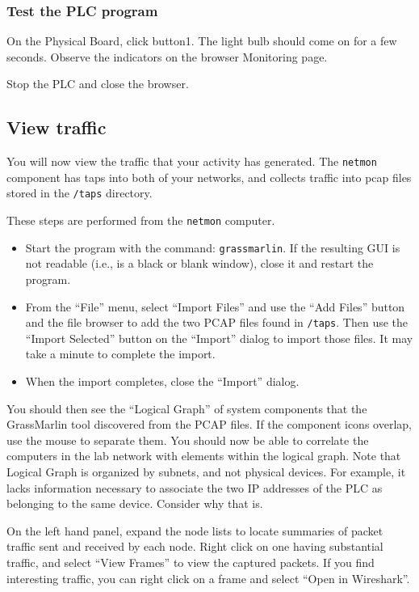 \subsubsection{Test the PLC program}
On the Physical Board, click button1.  The light bulb should come on for a few seconds.  Observe the indicators on the browser
Monitoring page.  

Stop the PLC and close the browser.

\subsection{View traffic}
You will now view the traffic that your activity has generated.  The {\tt netmon} component has taps into both of your networks, and collects 
traffic into pcap files stored in the {\tt /taps} directory.  

These steps are performed from the {\tt netmon} computer.
\begin{itemize}
\item Start the program with the command: {\tt grassmarlin}.  If the resulting GUI is not readable 
(i.e., is a black or blank window), close it and restart the program.
\item From the ``File'' menu, select ``Import Files'' and use the ``Add Files'' button and the file
browser to add the two PCAP files found in {\tt /taps}.  Then use the ``Import Selected'' button
on the ``Import'' dialog to import those files.  It may take a minute to complete the import.  
\item When the import completes, close the ``Import'' dialog.
\end{itemize}
You should then see the ``Logical Graph'' of system components that the GrassMarlin tool discovered from the
PCAP files.   If the component icons overlap, use the mouse to separate them.  You should now be able to correlate 
the computers in the lab network with elements within the logical graph.  Note that Logical Graph is organized by 
subnets,  and not physical devices.   For example, it lacks information necessary to associate the two IP addresses of the
PLC as belonging to the same device.  Consider why that is.

On the left hand panel, expand the node lists to locate summaries of packet traffic sent and received by
each node.  Right click on one having substantial traffic, and select ``View Frames'' to view the captured packets.
If you find interesting traffic, you can right click on a frame and select ``Open in Wireshark''.

